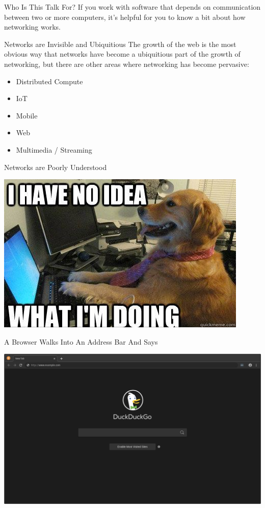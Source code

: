 \documentclass[presentation]{beamer}
\begin{document}
\begin{frame}[label={sec:org0e92236}]{Who Is This Talk For?}
If you work with software that depends on communication between two or
more computers, it's helpful for you to know a bit about how
networking works.
\end{frame}

\begin{frame}[label={sec:org63470c6}]{Networks are Invisible and Ubiquitious}
The growth of the web is the most obvious way that networks have
become a ubiquitious part of the growth of networking, but there are
other areas where networking has become pervasive:

\begin{itemize}
\item Distributed Compute
\item IoT
\item Mobile
\item Web
\item Multimedia / Streaming
\end{itemize}
\end{frame}

\begin{frame}[label={sec:orgb7ba256}]{Networks are Poorly Understood}
\begin{center}
\includegraphics[width=.9\linewidth]{./no-idea-what-im-doing-dog.png}
\end{center}
\end{frame}

\begin{frame}[label={sec:org76269e3}]{A Browser Walks Into An Address Bar And Says}
\begin{center}
\includegraphics[width=.9\linewidth]{./browser-example-com.png}
\end{center}
\end{frame}
\end{document}
